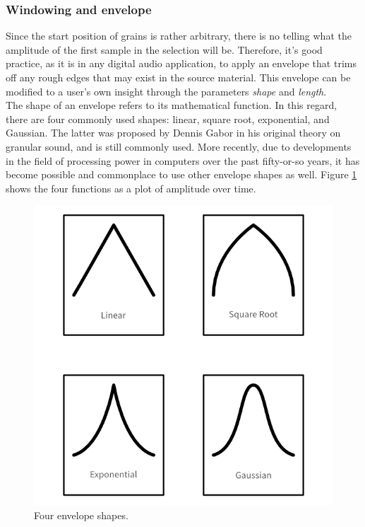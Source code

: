 \documentclass[10pt, twocolumn]{IEEEtran}
\begin{document}
\subsubsection{Windowing and envelope}
Since the start position of grains is rather arbitrary, there is no telling what the amplitude of the first sample in the selection will be. Therefore, it's good practice, as it is in any digital audio application, to apply an envelope that trims off any rough edges that may exist in the source material. This envelope can be modified to a user's own insight through the parameters \textit{shape} and \textit{length}. \\
The shape of an envelope refers to its mathematical function. In this regard, there are four commonly used shapes: linear, square root, exponential, and Gaussian. The latter was proposed by Dennis Gabor in his original theory on granular sound, and is still commonly used. More recently, due to developments in the field of processing power in computers over the past fifty-or-so years, it has become possible and commonplace to use other envelope shapes as well. Figure \ref{fig:env_shapes} shows the four functions as a plot of amplitude over time.

\begin{figure}[ht!]
	\includegraphics[width=\linewidth]{env_shapes.png}
	\caption{Four envelope shapes.}
	\label{fig:env_shapes}
\end{figure}
\end{document}
